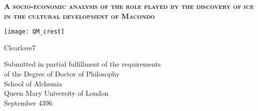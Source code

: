 \begin{titlepage}



\begin{center}

\begin{spacing}{2.5}
{\Huge \textsc{\textbf{A socio-economic analysis of the role played by the discovery of ice in the cultural development of Macondo}}}
\end{spacing}

\vspace{1.0 cm}

\begin{center}
\texttt{[image: QM\_crest]}
\end{center}
\vspace{0.9cm}


{\LARGE Clearlove7} %

\vspace{1cm}


{\large \sffamily
Submitted in partial fulfillment of the
requirements \\ of the Degree of Doctor of Philosophy\\
\vspace{0.9 cm}
School of Alchemia\\
\vspace{0.5 cm}
Queen Mary University of London\\
\vspace{0.5cm}
September 4396 %
}

\end{center}



\end{titlepage}

\restoregeometry  %
\doublespacing		%

